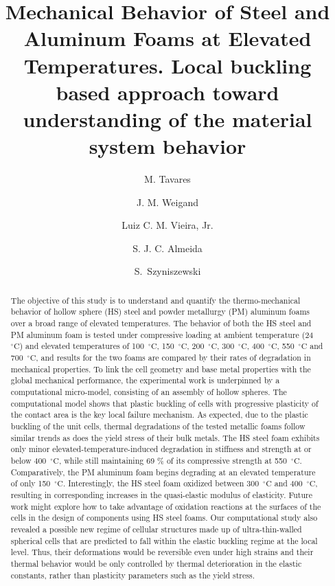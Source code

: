 \documentclass[review]{elsarticle}
\begin{document}
\begin{frontmatter}

\title{Mechanical Behavior of Steel and Aluminum Foams at Elevated Temperatures. Local buckling based approach toward understanding of the material system behavior}


\author[mymainaddress]{M. Tavares}
\author[]{J. M. Weigand}
\author[mymainaddress]{Luiz C. M. Vieira, Jr.}
\author[mymainaddress]{S. J. C. Almeida}
\author[mythirdaddress]{S.~Szyniszewski}

\address[mymainaddress]{Department of Structural Engineering, State University of Campinas, Campinas, Brazil}
\address[mythirdaddress]{Department of Engineering, Durham University, Durham, UK}


\begin{abstract}
The objective of this study is to understand and quantify the thermo-mechanical behavior of hollow sphere (HS) steel and powder metallurgy (PM) aluminum foams over a broad range of elevated temperatures. The behavior of both the HS steel and PM aluminum foam is tested under compressive loading at ambient temperature (24~$^\circ\mathrm{C}$) and elevated temperatures of 100~$^\circ\mathrm{C}$, 150~$^\circ\mathrm{C}$, 200~$^\circ\mathrm{C}$, 300~$^\circ\mathrm{C}$, 400~$^\circ\mathrm{C}$, 550~$^\circ\mathrm{C}$ and 700~$^\circ\mathrm{C}$, and results for the two foams are compared by their rates of degradation in mechanical properties. To link the cell geometry and base metal properties with the global mechanical performance, the experimental work is underpinned by a computational micro-model, consisting of an assembly of hollow spheres. The computational model shows that plastic buckling of cells with progressive plasticity of the contact area is the key local failure mechanism. As expected, due to the plastic buckling of the unit cells, thermal degradations of the tested metallic foams follow similar trends as does the yield stress of their bulk metals. The HS steel foam exhibits only minor elevated-temperature-induced degradation in stiffness and strength at or below 400~$^\circ\mathrm{C}$, while still maintaining 69 \% of its compressive strength at 550~$^\circ\mathrm{C}$. Comparatively, the PM aluminum foam begins degrading at an elevated temperature of only 150~$^\circ\mathrm{C}$. Interestingly, the HS steel foam oxidized between 300~$^\circ\mathrm{C}$ and 400~$^\circ\mathrm{C}$, resulting in corresponding increases in the quasi-elastic modulus of elasticity. Future work might explore how to take advantage of oxidation reactions at the surfaces of the cells in the design of components using HS steel foams. Our computational study also revealed a possible new regime of cellular structures made up of ultra-thin-walled spherical cells that are predicted to fall within the elastic buckling regime at the local level. Thus, their deformations would be reversible even under high strains and their thermal behavior would be only controlled by thermal deterioration in the elastic constants, rather than plasticity parameters such as the yield stress.
\end{abstract}


\end{frontmatter}
\end{document}
